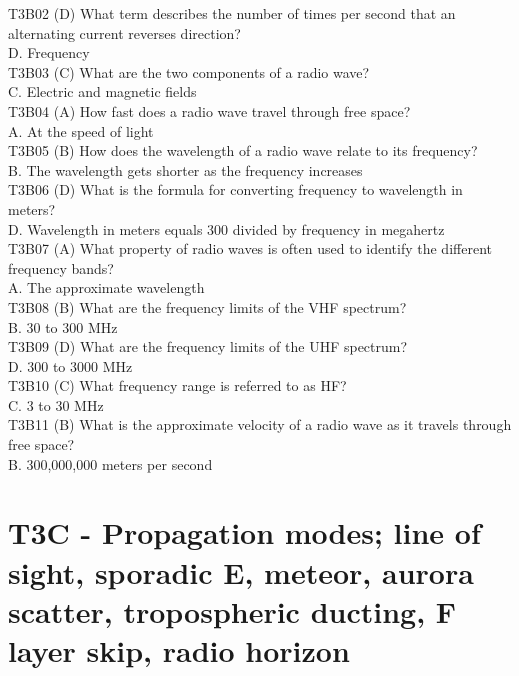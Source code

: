\documentclass[12pt,letterpaper]{report}
\begin{document}
T3B02 (D) What term describes the number of times per second that an alternating current reverses direction?\\
D. Frequency\\

T3B03 (C) What are the two components of a radio wave?\\
C. Electric and magnetic fields\\

T3B04 (A) How fast does a radio wave travel through free space?\\
A. At the speed of light\\

T3B05 (B) How does the wavelength of a radio wave relate to its frequency?\\
B. The wavelength gets shorter as the frequency increases\\

T3B06 (D) What is the formula for converting frequency to wavelength in meters?\\
D. Wavelength in meters equals 300 divided by frequency in megahertz\\

T3B07 (A) What property of radio waves is often used to identify the different frequency bands?\\
A. The approximate wavelength\\

T3B08 (B) What are the frequency limits of the VHF spectrum?\\
B. 30 to 300 MHz\\

T3B09 (D) What are the frequency limits of the UHF spectrum?\\
D. 300 to 3000 MHz\\

T3B10 (C) What frequency range is referred to as HF?\\
C. 3 to 30 MHz\\

T3B11 (B) What is the approximate velocity of a radio wave as it travels through free space?\\
B. 300,000,000 meters per second\\

\section{T3C - Propagation modes; line of sight, sporadic E, meteor, aurora scatter, tropospheric ducting, F layer skip, radio horizon}
\end{document}
